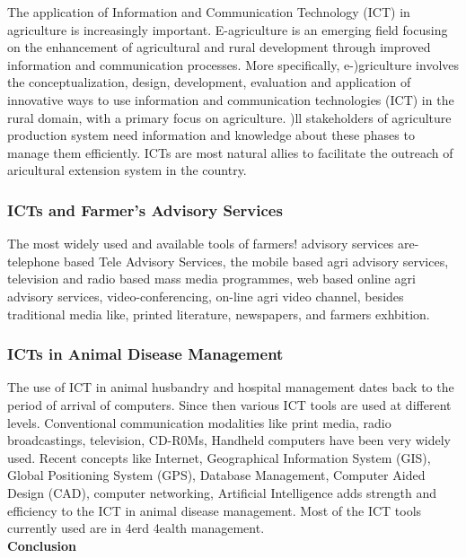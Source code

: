 \documentclass[12pt]{homework}
\begin{document}
The application of Information and Communication Technology (ICT) in agriculture is increasingly important. E-agriculture is an emerging field focusing on the enhancement of agricultural and rural development through improved information and communication processes. More specifically, e-)griculture involves the conceptualization, design, development, evaluation and application of innovative ways to use information and communication technologies (ICT) in the rural domain, with a  primary focus on agriculture. )ll stakeholders of agriculture production system need information and knowledge about these phases to manage them efficiently. ICTs are most natural allies to facilitate the outreach of aricultural extension system in the country.\\

\subsubsection{ICTs and Farmer's Advisory Services}
The most widely used and available tools of farmers! advisory services are- telephone based Tele Advisory Services, the mobile based agri advisory services, television and radio based mass media  programmes, web based online agri advisory services, video-conferencing, on-line agri video channel, besides traditional media like, printed literature, newspapers, and farmers exhbition.\\

\subsubsection{ICTs in Animal Disease Management}
The use of ICT in animal husbandry and hospital management dates back to the period of arrival of computers. Since then various ICT tools are used at different levels. Conventional communication modalities like print media, radio broadcastings, television, CD-R0Ms, Handheld computers have been very widely used. Recent concepts like Internet, Geographical Information System (GIS), Global Positioning System (GPS), Database Management, Computer Aided Design (CAD), computer networking, Artificial Intelligence adds strength and efficiency to the ICT in animal disease management. Most of the ICT tools currently used are in 4erd 4ealth management.\\

\newline
\textbf{Conclusion}
\end{document}
